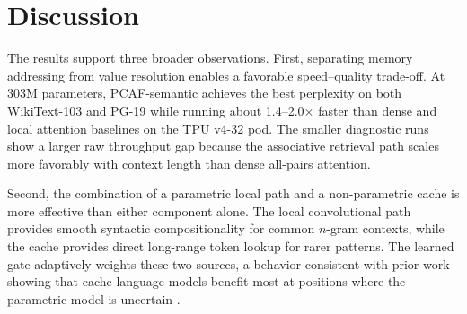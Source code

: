\documentclass{article}
\newcommand{\tableformat}{\footnotesize\setlength{\tabcolsep}{4pt}\renewcommand{\arraystretch}{1.08}}
\begin{document}
\begin{table}[!htbp]
  \centering
  \caption{WikiText-2 next-token prediction at context length 2048.
  PCAF-context benefits from the longer context while sparse attention
  becomes slower and less accurate under this memory budget.}
  \label{tab:main2048}
  \begingroup
  \tableformat
  \endgroup
\end{table}
\FloatBarrier

\section{Discussion}

The results support three broader observations. First, separating memory
addressing from value resolution enables a favorable speed--quality trade-off.
At 303M parameters, PCAF-semantic achieves the best perplexity on both
WikiText-103 and PG-19 while running about 1.4--2.0$\times$ faster than dense
and local attention baselines on the TPU v4-32 pod. The smaller diagnostic runs
show a larger raw throughput gap because the associative retrieval path scales
more favorably with context length than dense all-pairs attention.

Second, the combination of a parametric local path and a non-parametric cache
is more effective than either component alone. The local convolutional path
provides smooth syntactic compositionality for common $n$-gram contexts, while
the cache provides direct long-range token lookup for rarer patterns. The
learned gate adaptively weights these two sources, a behavior consistent with
prior work showing that cache language models benefit most at positions where
the parametric model is uncertain
\citep{grave2016continuous,khandelwal2019knn}.
\end{document}
